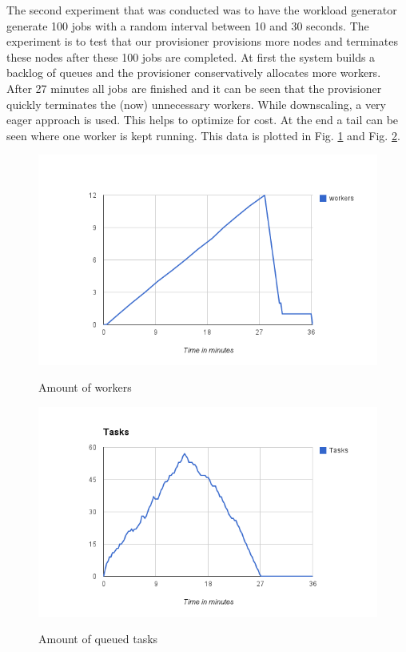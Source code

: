 \documentclass[a4paper]{IEEEtran}
\begin{document}
The second experiment that was conducted was to have the workload generator generate 100 jobs with a random interval between 10 and 30 seconds.
The experiment is to test that our provisioner provisions more nodes and terminates these nodes after these 100 jobs are completed.
At first the system builds a backlog of queues and the provisioner conservatively allocates more workers.
After 27 minutes all jobs are finished and it can be seen that the provisioner quickly terminates the (now) unnecessary workers.
While downscaling, a very eager approach is used.
This helps to optimize for cost.
At the end a tail can be seen where one worker is kept running.
This data is plotted in Fig. \ref{fig:100-workers} and Fig. \ref{fig:100-tasks}.

\begin{figure}[ht]
	\includegraphics[scale=0.5]{fig/100workers.png}
	\label{fig:100-workers}
	\caption{Amount of workers}
\end{figure}

\begin{figure}[ht]
	\includegraphics[scale=0.5]{fig/100tasks.png}
	\label{fig:100-tasks}
	\caption{Amount of queued tasks}
\end{figure}
\end{document}
